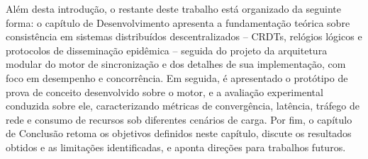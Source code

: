 Além desta introdução, o restante deste trabalho está organizado da
seguinte forma: o capítulo de Desenvolvimento apresenta a fundamentação
teórica sobre consistência em sistemas distribuídos descentralizados --
CRDTs, relógios lógicos e protocolos de disseminação epidêmica -- seguida
do projeto da arquitetura modular do motor de sincronização e dos detalhes
de sua implementação, com foco em desempenho e concorrência. Em seguida, é
apresentado o protótipo de prova de conceito desenvolvido sobre o motor, e
a avaliação experimental conduzida sobre ele, caracterizando métricas de
convergência, latência, tráfego de rede e consumo de recursos sob
diferentes cenários de carga. Por fim, o capítulo de Conclusão retoma os
objetivos definidos neste capítulo, discute os resultados obtidos e as
limitações identificadas, e aponta direções para trabalhos futuros.
